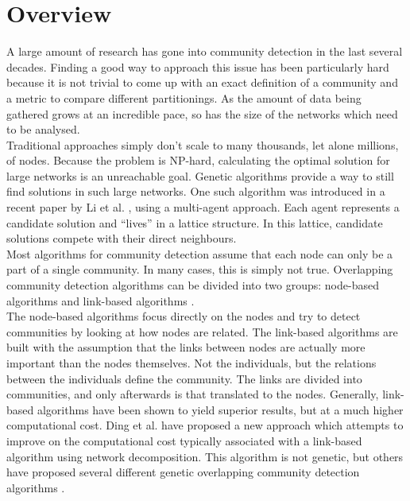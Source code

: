 \documentclass[twoside,twocolumn]{article}
\begin{document}
\section{Overview}
A large amount of research has gone into community detection in the last several decades. Finding a good way to approach this issue has been particularly hard because it is not trivial to come up with an exact definition of a community and a metric to compare different partitionings. As the amount of data being gathered grows at an incredible pace, so has the size of the networks which need to be analysed. \\ \newline
Traditional approaches simply don't scale to many thousands, let alone millions, of nodes. Because the problem is NP-hard, calculating the optimal solution for large networks is an unreachable goal. Genetic algorithms provide a way to still find solutions in such large networks. One such algorithm was introduced in a recent paper by Li et al. \cite{multiagent2016}, using a multi-agent approach. Each agent represents a candidate solution and ``lives'' in a lattice structure. In this lattice, candidate solutions compete with their direct neighbours. \\ \newline
Most algorithms for community detection assume that each node can only be a part of a single community. In many cases, this is simply not true. Overlapping community detection algorithms can be divided into two groups: node-based algorithms and link-based algorithms \cite{linkclus2013}.\\ \newline
The node-based algorithms focus directly on the nodes and try to detect communities by looking at how nodes are related. The link-based algorithms are built with the assumption that the links between nodes are actually more important than the nodes themselves. Not the individuals, but the relations between the individuals define the community. The links are divided into communities, and only afterwards is that translated to the nodes. Generally, link-based algorithms have been shown to yield superior results, but at a much higher computational cost. Ding et al. \cite{Ding2016} have proposed a new approach which attempts to improve on the computational cost typically associated with a link-based algorithm using network decomposition. This algorithm is not genetic,  but others have proposed several different genetic overlapping community detection algorithms \cite{linkclus2013, Pizzuti2009, Dickinson2013}.\\
\end{document}
